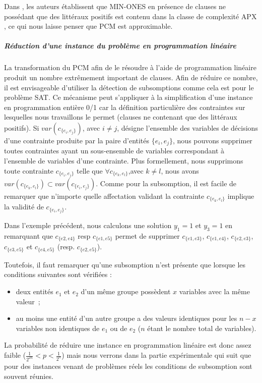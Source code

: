 Dans \cite{creignou2001complexity}, les auteurs établissent que  MIN-ONES en
présence de clauses ne possédant que des littéraux positifs est contenu dans la
classe de complexité APX \cite{PapadimitriouY91}, ce qui nous laisse penser
que PCM est approximable.

\subparagraph{Réduction d'une instance du problème en programmation linéaire}
\label{sec::reduc}

La transformation du PCM afin de le résoudre à l'aide de programmation linéaire
produit un nombre extrêmement important de clauses. Afin de réduire ce nombre, il
est envisageable d'utiliser la détection de subsomptions \cite{sub} comme cela
est pour le problème SAT. Ce mécanisme peut s'appliquer à
la simplification d'une instance en programmation entière 0/1 car la définition
particulière des contraintes sur lesquelles nous travaillons le permet
(clauses ne contenant que des littéraux positifs). Si
$var(c_{\{e_i,e_j\}})$, avec $i \neq j$, désigne l'ensemble des variables de
décisions d'une contrainte  produite par la paire d'entités $\{e_i,e_j\}$, nous
pouvons supprimer toutes contraintes ayant un sous-ensemble de variables
correspondant à l'ensemble de variables d'une contrainte. Plus formellement,
nous supprimons toute contrainte $c_{\{e_i,e_j\}}$ telle que $\forall
c_{\{e_k,e_l\}}$,avec $k \neq l$, nous avons  $var(c_{\{e_k,e_l\}})\subset
var(c_{\{e_i,e_j\}})$. Comme pour la
subsomption, il est facile de remarquer que n'importe quelle affectation
validant la contrainte $c_{\{e_k,e_l\}}$ implique la validité de
$c_{\{e_i,e_j\}}$.

Dans l'exemple précédent, nous calculons une solution $y_1=1$ et $y_3=1$
en remarquant que $c_{\{e2,e4\}}$ {resp $c_{\{e1,e5\}}$}  permet de supprimer
$c_{\{e1,e3\}}$, $c_{\{e1,e4\}}$, $c_{\{e2,e3\}}$, $c_{\{e3,e5\}}$ et
$c_{\{e4,e5\}}$ (resp. $c_{\{e2,e5\}}$).

Toutefois, il faut remarquer qu'une subsomption n'est présente que lorsque les conditions suivantes sont vérifiées :
\begin{itemize}
\item deux entités $e_1$ et $e_2$ d'un même groupe possèdent $x$ variables avec la même valeur~;
\item au moins une entité d'un autre groupe a des valeurs identiques pour les $n-x$ variables non identiques de  $e_1$ ou de $e_2$ ($n$ étant le nombre total de variables).
\end{itemize}

La probabilité de réduire une instance en programmation linéaire est donc assez faible ($\frac{1}{2^{2n}}<p<\frac{1}{2^{n}}$) mais nous verrons dans la partie expérimentale qui suit que pour des instances venant de problèmes réels les conditions de subsomption sont souvent réunies.

